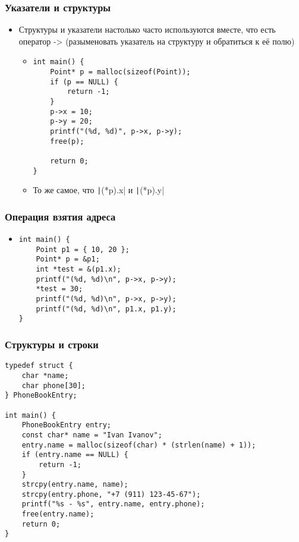 \documentclass{../../slides-style}
\begin{document}
    \begin{frame}[fragile]
        \frametitle{Указатели и структуры}
        \begin{itemize}
            \item Структуры и указатели настолько часто используются вместе, что есть оператор -> (разыменовать указатель на структуру и обратиться к её полю)
            \begin{itemize}
                \item 
                \begin{footnotesize}
                    \begin{verbatim}
int main() {
    Point* p = malloc(sizeof(Point));
    if (p == NULL) {
        return -1;
    }
    p->x = 10;
    p->y = 20;
    printf("(%d, %d)", p->x, p->y);
    free(p);

    return 0;
}                    \end{verbatim}
                \end{footnotesize}
                \item То же самое, что \texttt|(*p).x| и \texttt|(*p).y|
            \end{itemize}
        \end{itemize}
    \end{frame}

    \begin{frame}[fragile]
        \frametitle{Операция взятия адреса}
        \begin{itemize}
            \item 
                \begin{verbatim}
int main() {
    Point p1 = { 10, 20 };
    Point* p = &p1;
    int *test = &(p1.x);
    printf("(%d, %d)\n", p->x, p->y);
    *test = 30;
    printf("(%d, %d)\n", p->x, p->y);
    printf("(%d, %d)\n", p1.x, p1.y);
}
                \end{verbatim}
        \end{itemize}
    \end{frame}

    \begin{frame}[fragile]
        \frametitle{Структуры и строки}
        \begin{footnotesize}
            \begin{verbatim}
typedef struct {
    char *name;
    char phone[30];
} PhoneBookEntry;

int main() {
    PhoneBookEntry entry;
    const char* name = "Ivan Ivanov";
    entry.name = malloc(sizeof(char) * (strlen(name) + 1));
    if (entry.name == NULL) {
        return -1;
    }
    strcpy(entry.name, name);
    strcpy(entry.phone, "+7 (911) 123-45-67");
    printf("%s - %s", entry.name, entry.phone);
    free(entry.name);
    return 0;
}
            \end{verbatim}
        \end{footnotesize}
    \end{frame}
\end{document}
